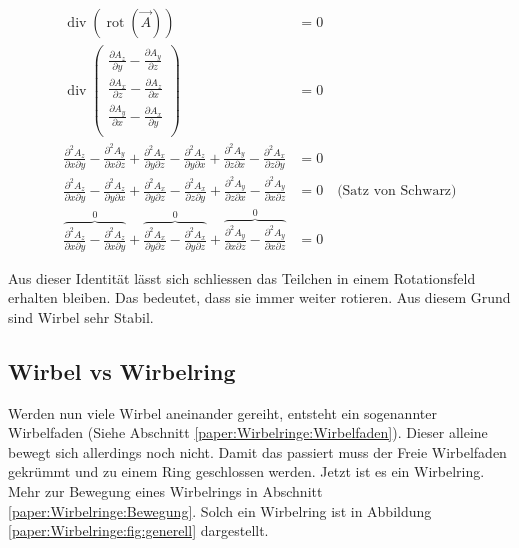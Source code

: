 \begin{align*}
\operatorname{div} \left( \operatorname{rot} \left( \vec{A} \right) \right) 
&= 0\\
\operatorname{div}      
    \begin{pmatrix} 
        \frac{\partial A_z}{\partial y} - \frac{\partial A_y}{\partial z} \\ 
        \frac{\partial A_x}{\partial z} - \frac{\partial A_z}{\partial x} \\ 
        \frac{\partial A_y}{\partial x} - \frac{\partial A_x}{\partial y} \\ 
    \end{pmatrix} 
&= 0\\
\frac{\partial^2 A_z}{\partial x \partial y} - \frac{\partial^2 A_y}{\partial x \partial z} + 
\frac{\partial^2 A_x}{\partial y \partial z} - \frac{\partial^2 A_z}{\partial y \partial x} +
\frac{\partial^2 A_y}{\partial z \partial x} - \frac{\partial^2 A_x}{\partial z \partial y}
&= 0\\
\frac{\partial^2 A_z}{\partial x \partial y} - \frac{\partial^2 A_z}{\partial y \partial x} + 
\frac{\partial^2 A_x}{\partial y \partial z} - \frac{\partial^2 A_x}{\partial z \partial y} +
\frac{\partial^2 A_y}{\partial z \partial x} - \frac{\partial^2 A_y}{\partial x \partial z}
&= 0 \quad \text{(Satz von Schwarz)}\\
\overbrace{\frac{\partial^2 A_z}{\partial x \partial y} - \frac{\partial^2 A_z}{\partial x \partial y}}^0 + 
\overbrace{\frac{\partial^2 A_x}{\partial y \partial z} - \frac{\partial^2 A_x}{\partial y \partial z}}^0 +
\overbrace{\frac{\partial^2 A_y}{\partial x \partial z} - \frac{\partial^2 A_y}{\partial x \partial z}}^0
&= 0 
\end{align*}

Aus dieser Identität lässt sich schliessen das Teilchen in einem Rotationsfeld erhalten bleiben. 
Das bedeutet, dass sie immer weiter rotieren. 
Aus diesem Grund sind Wirbel sehr Stabil.

\subsection{Wirbel vs Wirbelring}

Werden nun viele Wirbel aneinander gereiht, entsteht ein sogenannter Wirbelfaden (Siehe Abschnitt \ref{paper:Wirbelringe:Wirbelfaden}).
Dieser alleine bewegt sich allerdings noch nicht. 
Damit das passiert muss der Freie Wirbelfaden gekrümmt und zu einem Ring geschlossen werden. 
Jetzt ist es ein Wirbelring.  
Mehr zur Bewegung eines Wirbelrings in Abschnitt \ref{paper:Wirbelringe:Bewegung}.
Solch ein Wirbelring ist in Abbildung \ref{paper:Wirbelringe:fig:generell} dargestellt.
